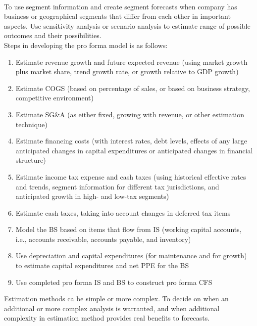 \begin{method} \\
To use segment information and create segment forecasts when company has business or geographical segments that differ from each other in important aspects. Use sensitivity analysis or scenario analysis to estimate range of possible outcomes and their possibilities.\\
Steps in developing the pro forma model is as follows:
\begin{enumerate}[label=\roman*.]
\setlength{\itemsep}{0pt}
\item Estimate revenue growth and future expected revenue (using market growth plus market share, trend growth rate, or growth relative to GDP growth)
\item Estimate COGS (based on percentage of sales, or based on business strategy, competitive environment)
\item Estimate SG\&A (as either fixed, growing with revenue, or other estimation technique)
\item Estimate financing costs (with interest rates, debt levels, effects of any large anticipated changes in capital expenditures or anticipated changes in financial structure)
\item Estimate income tax expense and cash taxes (using historical effective rates and trends, segment information for different tax jurisdictions, and anticipated growth in high- and low-tax segments)
\item Estimate cash taxes, taking into account changes in deferred tax items
\item Model the BS based on items that flow from IS (working capital accounts, i.e., accounts receivable, accounts payable, and inventory)
\item Use depreciation and capital expenditures (for maintenance and for growth) to estimate capital expenditures and net PPE for the BS
\item Use completed pro forma IS and BS to construct pro forma CFS
\end{enumerate}
Estimation methods ca be simple or more complex. To decide on when an additional or more complex analysis is warranted, and when additional complexity in estimation method provides real benefits to forecasts.
\end{method}
